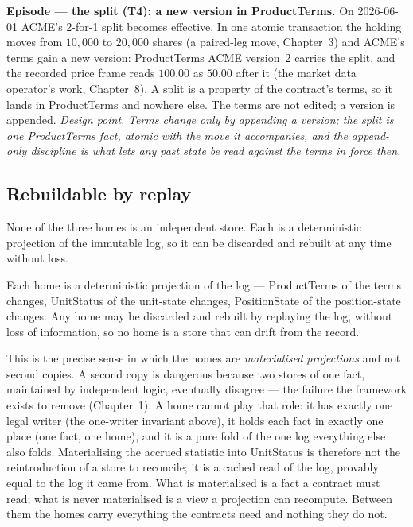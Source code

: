 \medskip\noindent\textbf{Episode --- the split (T4): a new version in ProductTerms.}
On 2026-06-01 ACME's 2-for-1 split becomes effective. In one atomic transaction the holding
moves from $10{,}000$ to $20{,}000$ shares (a paired-leg move, Chapter~3) and
ACME's terms gain a new version: ProductTerms ACME version~2 carries the split, and the
recorded price frame reads $100.00$ as $50.00$ after it (the market data operator's work,
Chapter~8). A split is a property of the contract's terms, so
it lands in ProductTerms and nowhere else. The terms are not edited; a version is appended.
\emph{Design point.} \emph{Terms change only by appending a version; the split is one
ProductTerms fact, atomic with the move it accompanies, and the append-only discipline is
what lets any past state be read against the terms in force then.}

\subsection{Rebuildable by replay}

None of the three homes is an independent store. Each is a deterministic projection of the
immutable log, so it can be discarded and rebuilt at any time without loss.

\begin{principle}\label{prin:rebuildable}
Each home is a deterministic projection of the log --- ProductTerms of the terms changes,
UnitStatus of the unit-state changes, PositionState of the position-state changes. Any
home may be discarded and rebuilt by replaying the log, without loss of information, so no
home is a store that can drift from the record.
\end{principle}

This is the precise sense in which the homes are \emph{materialised projections} and not
second copies. A second copy is dangerous because two stores of one fact, maintained by
independent logic, eventually disagree --- the failure the framework exists to remove
(Chapter~1). A home cannot play that role: it has exactly one legal
writer (the one-writer invariant above), it holds each fact in exactly one place
(one fact, one home), and it is a pure fold of the one log everything else also
folds. Materialising the accrued statistic into UnitStatus is therefore not the
reintroduction of a store to reconcile; it is a cached read of the log, provably equal to
the log it came from. What is materialised is a fact a contract must read; what is never
materialised is a view a projection can recompute. Between them the homes carry everything
the contracts need and nothing they do not.

